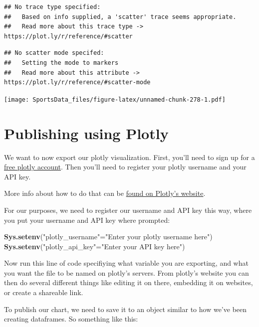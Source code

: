\documentclass[]{book}
\newenvironment{Shaded}{\begin{snugshade}}{\end{snugshade}}
\newcommand{\KeywordTok}[1]{\textcolor[rgb]{0.13,0.29,0.53}{\textbf{#1}}}
\newcommand{\NormalTok}[1]{#1}
\newcommand{\StringTok}[1]{\textcolor[rgb]{0.31,0.60,0.02}{#1}}
\begin{document}
\begin{verbatim}
## No trace type specified:
##   Based on info supplied, a 'scatter' trace seems appropriate.
##   Read more about this trace type -> https://plot.ly/r/reference/#scatter
\end{verbatim}

\begin{verbatim}
## No scatter mode specifed:
##   Setting the mode to markers
##   Read more about this attribute -> https://plot.ly/r/reference/#scatter-mode
\end{verbatim}

\texttt{[image: SportsData\_files/figure-latex/unnamed-chunk-278-1.pdf]}

\hypertarget{publishing-using-plotly}{%
\section{Publishing using Plotly}\label{publishing-using-plotly}}

We want to now export our plotly visualization. First, you'll need to sign up for a \href{https://plot.ly/}{free plotly account}. Then you'll need to register your plotly username and your API key.

More info about how to do that can be \href{https://plot.ly/r/getting-started/\#initialization-for-online-plotting}{found on Plotly's website}.

For our purposes, we need to register our username and API key this way, where you put your username and API key where prompted:

\begin{Shaded}
\begin{Highlighting}[]
\KeywordTok{Sys.setenv}\NormalTok{(}\StringTok{"plotly_username"}\NormalTok{=}\StringTok{"Enter your plotly username here"}\NormalTok{)}
\KeywordTok{Sys.setenv}\NormalTok{(}\StringTok{"plotly_api_key"}\NormalTok{=}\StringTok{"Enter your API key here"}\NormalTok{)}
\end{Highlighting}
\end{Shaded}

Now run this line of code specifiying what variable you are exporting, and what you want the file to be named on plotly's servers. From plotly's website you can then do several different things like editing it on there, embedding it on websites, or create a shareable link.

To publish our chart, we need to save it to an object similar to how we've been creating dataframes. So something like this:
\end{document}
